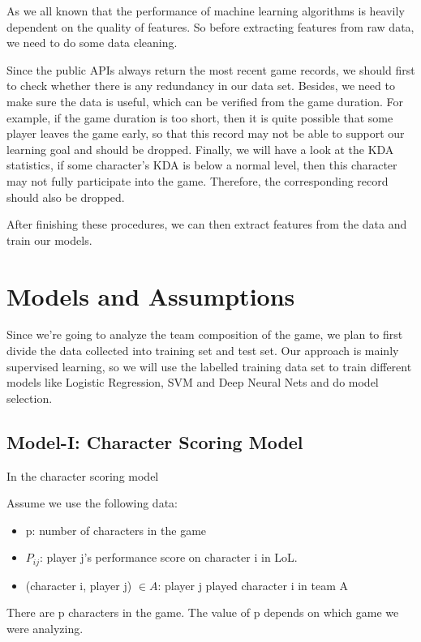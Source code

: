 \documentclass[conference]{IEEEtran}
\begin{document}
As we all known that the performance of machine learning algorithms is heavily dependent on the quality of features. So before extracting features from raw data, we need to do some data cleaning.

Since the public APIs always return the most recent game records, we should first to check whether there is any redundancy in our data set. Besides, we need to make sure the data is useful, which can be verified from the game duration. For example, if the game duration is too short, then it is quite possible that some player leaves the game early, so that this record may not be able to support our learning goal and should be dropped. Finally, we will have a look at the KDA statistics, if some character's KDA is below a normal level, then this character may not fully participate into the game. Therefore, the corresponding record should also be dropped.

After finishing these procedures, we can then extract features from the data and train our models.

\section{Models and Assumptions}

Since we're going to analyze the team composition of the game, we plan to first divide the data collected into training set and test set. Our approach is mainly supervised learning, so we will use the labelled training data set to train different models like Logistic Regression, SVM and Deep Neural Nets and do model selection.

\subsection{Model-I: Character Scoring Model}

In the character scoring model

Assume we use the following data:
\begin{itemize}
\item p: number of characters in the game
\item $P_{ij}$: player j's performance score on character i in LoL.
\item (character i, player j) $\in A$: player j played character i in team A

\end{itemize}
There are p characters in the game. The value of p depends on which game we were analyzing.
\end{document}
